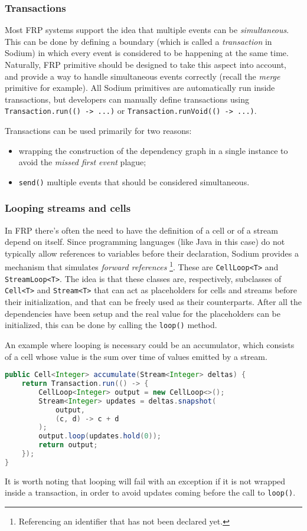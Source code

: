 \subsubsection{Transactions}
\label{sec:transactions}

Most FRP systems support the idea that multiple events can be \textit{simultaneous}.
%
This can be done by defining a boundary (which is called a \textit{transaction} in Sodium) in which every event is considered to be happening at the same time.
%
Naturally, FRP primitive should be designed to take this aspect into account, and provide a way to handle simultaneous events correctly (recall the \textit{merge} primitive for example).
%
All Sodium primitives are automatically run inside transactions, but developers can manually define transactions using \texttt{Transaction.run(() -> ...)} or \texttt{Transaction.runVoid(() -> ...)}.

Transactions can be used primarily for two reasons:
%
\begin{itemize}
    \item wrapping the construction of the dependency graph in a single instance to avoid the \textit{missed first event} plague;
    \item \texttt{send()} multiple events that should be considered simultaneous.
\end{itemize}

\subsubsection{Looping streams and cells}

In FRP there's often the need to have the definition of a cell or of a stream depend on itself.
%
Since programming languages (like Java in this case) do not typically allow references to variables before their declaration, Sodium provides a mechanism that simulates \textit{forward references} \footnote{Referencing an identifier that has not been declared yet.}.
%
These are \texttt{CellLoop<T>} and \texttt{StreamLoop<T>}.
%
The idea is that these classes are, respectively, subclasses of \texttt{Cell<T>} and \texttt{Stream<T>} that can act as placeholders for cells and streams before their initialization, and that can be freely used as their counterparts.
%
After all the dependencies have been setup and the real value for the placeholders can be initialized, this can be done by calling the \texttt{loop()} method.

An example where looping is necessary could be an accumulator, which consists of a cell whose value is the sum over time of values emitted by a stream.
%
\begin{lstlisting}[frame=single, language=java]
public Cell<Integer> accumulate(Stream<Integer> deltas) {
    return Transaction.run(() -> {
        CellLoop<Integer> output = new CellLoop<>();
        Stream<Integer> updates = deltas.snapshot(
            output,
            (c, d) -> c + d
        );
        output.loop(updates.hold(0));
        return output;
    });
}
\end{lstlisting}
%
It is worth noting that looping will fail with an exception if it is not wrapped inside a transaction, in order to avoid updates coming before the call to \texttt{loop()}.
